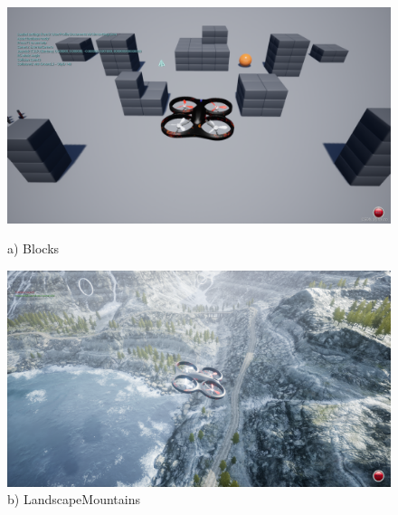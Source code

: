 \begin{figure}[H]
  \centering
  \begin{minipage}{0.45\textwidth}
      \centering
      \includegraphics[width=\linewidth]{figs/Plataformas_Desarollo/mapas_airsim/blocks.png}
      \caption*{a) Blocks}
  \end{minipage}%
  \begin{minipage}{0.45\textwidth}
      \centering
      \includegraphics[width=\linewidth]{figs/Plataformas_Desarollo/mapas_airsim/landscapemountains.png}
      \caption*{b) LandscapeMountains}
  \end{minipage}


\end{figure}

